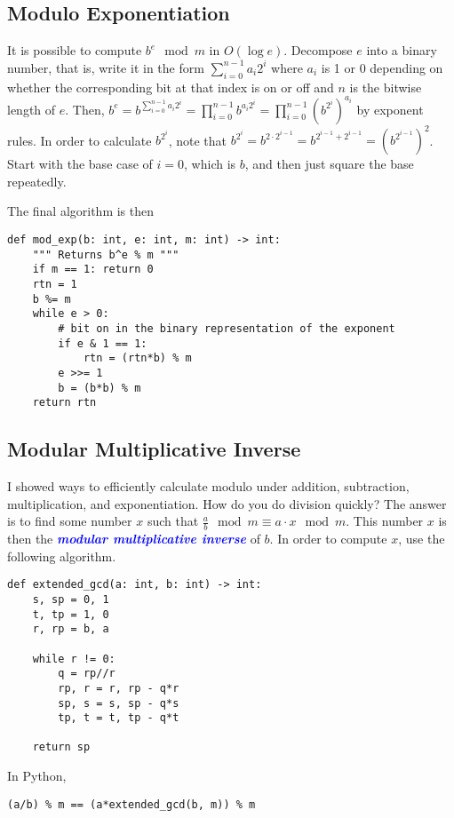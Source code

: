\documentclass[11pt, oneside]{article}
\newcommand{\emphasis}[1]{\textcolor{blue}{\textbf{\textit{#1}}}}
\begin{document}
\subsection{Modulo Exponentiation}
It is possible to compute \( b^e \mod m \) in \( O(\log e) \). Decompose \( e \)
into a binary number, that is, write it in the form \( \sum^{n - 1}_{i = 0} a_i 2^i \)
where \( a_i \) is 1 or 0 depending on whether the corresponding bit at that index is on or off and \( n \)
is the bitwise length of \( e \).
Then, \( b^e = b^{\sum^{n - 1}_{i = 0} a_i 2^i} = \prod^{n - 1}_{i = 0} b^{a_i 2^i} = \prod^{n - 1}_{i = 0} (b^{2^i})^{a_i} \)
by exponent rules. In order to calculate \( b^{2^i} \), note that \( b^{2^i} = b^{2 \cdot 2^{i - 1}} = b^{2^{i - 1} + 2^{i - 1}} = (b^{2^{i - 1}})^2 \).
Start with the base case of \( i = 0 \), which is \( b \), and then just square the base repeatedly.

The final algorithm is then
\begin{verbatim}
def mod_exp(b: int, e: int, m: int) -> int:
    """ Returns b^e % m """
    if m == 1: return 0
    rtn = 1
    b %= m
    while e > 0:
        # bit on in the binary representation of the exponent
        if e & 1 == 1:
            rtn = (rtn*b) % m
        e >>= 1
        b = (b*b) % m
    return rtn
\end{verbatim}

\subsection{Modular Multiplicative Inverse}
I showed ways to efficiently calculate modulo under addition, subtraction, multiplication, and exponentiation.
How do you do division quickly?
The answer is to find some number \( x \) such that \( \frac{a}{b} \mod m \equiv a \cdot x \mod m \).
This number \( x \) is then the \emphasis{modular multiplicative inverse} of \( b \).
In order to compute \( x \), use the following algorithm.
\begin{verbatim}
def extended_gcd(a: int, b: int) -> int:
    s, sp = 0, 1
    t, tp = 1, 0
    r, rp = b, a

    while r != 0:
        q = rp//r
        rp, r = r, rp - q*r
        sp, s = s, sp - q*s
        tp, t = t, tp - q*t

    return sp
\end{verbatim}
In Python,
\begin{verbatim}
(a/b) % m == (a*extended_gcd(b, m)) % m
\end{verbatim}
\end{document}
